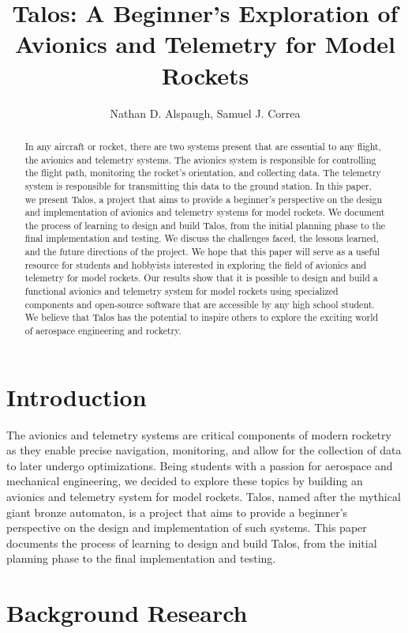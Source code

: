 \documentclass{article}
\title{Talos: A Beginner's Exploration of Avionics and Telemetry for Model Rockets}
\author{Nathan D. Alspaugh, Samuel J. Correa}
\begin{document}
\maketitle

\begin{abstract}
      In any aircraft or rocket, there are two systems present that are essential to any flight, the avionics and telemetry systems. The avionics system is responsible for controlling the flight path, monitoring the rocket's orientation, and collecting data. The telemetry system is responsible for transmitting this data to the ground station. In this paper, we present Talos, a project that aims to provide a beginner's perspective on the design and implementation of avionics and telemetry systems for model rockets. We document the process of learning to design and build Talos, from the initial planning phase to the final implementation and testing. We discuss the challenges faced, the lessons learned, and the future directions of the project. We hope that this paper will serve as a useful resource for students and hobbyists interested in exploring the field of avionics and telemetry for model rockets. Our results show that it is possible to design and build a functional avionics and telemetry system for model rockets using specialized components and open-source software that are accessible by any high school student. We believe that Talos has the potential to inspire others to explore the exciting world of aerospace engineering and rocketry.
\end{abstract}

\section{Introduction}

The avionics and telemetry systems are critical components of modern rocketry as they enable precise navigation, monitoring, and allow for the collection of data to later undergo optimizations. Being students with a passion for aerospace and mechanical engineering, we decided to explore these topics by building an avionics and telemetry system for model rockets. Talos, named after the mythical giant bronze automaton, is a project that aims to provide a beginner's perspective on the design and implementation of such systems. This paper documents the process of learning to design and build Talos, from the initial planning phase to the final implementation and testing.

\section{Background Research}
\end{document}
